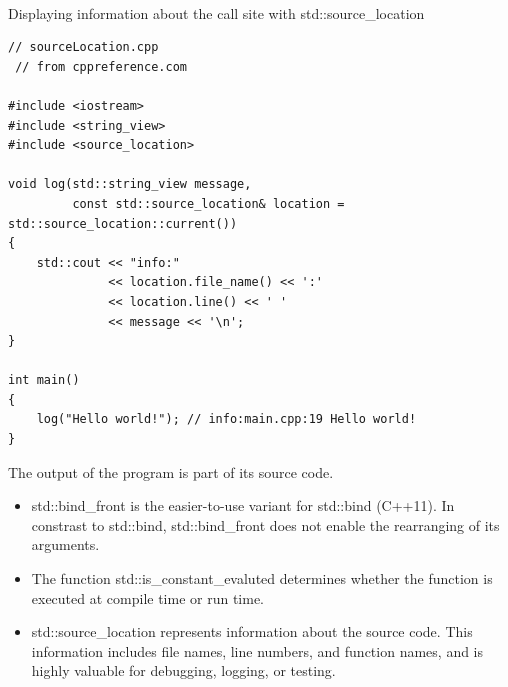 \hspace*{\fill} \\ %
\noindent
Displaying information about the call site with std::source\_location
\begin{lstlisting}[style=styleCXX]
// sourceLocation.cpp
 // from cppreference.com

#include <iostream>
#include <string_view>
#include <source_location>

void log(std::string_view message,
		 const std::source_location& location = std::source_location::current())
{
	std::cout << "info:"
			  << location.file_name() << ':'
			  << location.line() << ' '
			  << message << '\n';
}

int main()
{
	log("Hello world!"); // info:main.cpp:19 Hello world!
}
\end{lstlisting}

The output of the program is part of its source code.

\begin{tcolorbox}[colback=mygreen!5!white,colframe=mygreen!75!black,title={Distilled Information}]

\begin{itemize}
\item 
std::bind\_front is the easier-to-use variant for std::bind (C++11). In constrast to std::bind, std::bind\_front does not enable the rearranging of its arguments.

\item 
The function std::is\_constant\_evaluted determines whether the function is executed at compile time or run time.

\item 
std::source\_location represents information about the source code. This information includes file names, line numbers, and function names, and is highly valuable for debugging, logging, or testing.
\end{itemize}

\end{tcolorbox}








